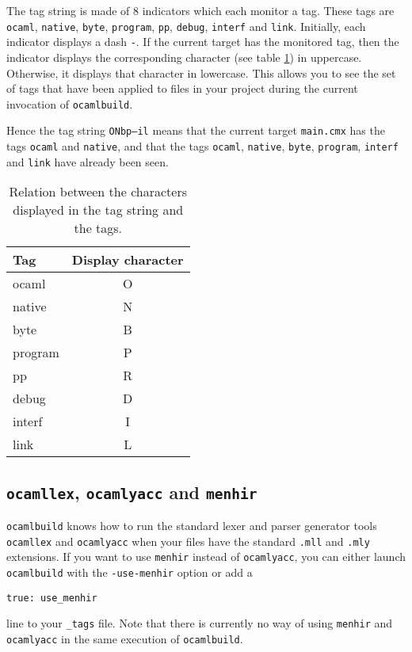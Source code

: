 \documentclass[9pt]{article}
\newcommand{\ocb}{\texttt{ocamlbuild}\xspace}
\newcommand{\tags}{\texttt{\_tags}\xspace}
\begin{document}
The tag string is made of 8 indicators which each monitor a tag. These tags
are \texttt{ocaml}, \texttt{native}, \texttt{byte}, \texttt{program},
\texttt{pp}, \texttt{debug}, \texttt{interf} and \texttt{link}.  Initially,
each indicator displays a dash \texttt{-}.  If the current target has the
monitored tag, then the indicator displays the corresponding character
(see table \ref{tab:tag-chars}) in uppercase.  Otherwise, it displays that
character in lowercase.  This allows you to see the set of tags that have
been applied to files in your project during the current invocation of \ocb.

Hence the tag string \texttt{ONbp--il} means that the current target
\texttt{main.cmx} has the tags \texttt{ocaml} and \texttt{native}, and that
the tags \texttt{ocaml}, \texttt{native}, \texttt{byte}, \texttt{program},
\texttt{interf} and \texttt{link} have already been seen.

\begin{table}
  \begin{center}
    \begin{tabular}{|l|c|}
       \hline
       \textbf{Tag} & \textbf{Display character} \\
       \hline
       \hline
       ocaml    & O \\
       \hline
       native   & N \\
       \hline
       byte     & B \\
       \hline
       program  & P \\
       \hline
       pp       & R \\
       \hline
       debug    & D \\
       \hline
       interf   & I \\
       \hline
       link     & L \\
       \hline
    \end{tabular}
  \end{center}
  \caption{\label{tab:tag-chars} Relation between the characters displayed in
    the tag string and the tags.}
\end{table}
\subsection{\texttt{ocamllex}, \texttt{ocamlyacc} and \texttt{menhir}}
\ocb knows how to run the standard lexer and parser generator tools
\texttt{ocamllex} and \texttt{ocamlyacc} when your files have the
standard \texttt{.mll} and \texttt{.mly} extensions.  If you want to
use \texttt{menhir} instead of \texttt{ocamlyacc}, you can either
launch \ocb with the \texttt{-use-menhir} option or add a
\begin{verbatim}
true: use_menhir
\end{verbatim}
line to your \tags file.  Note that there is currently no way
of using \texttt{menhir} and \texttt{ocamlyacc} in the same execution
of \ocb.
\end{document}
